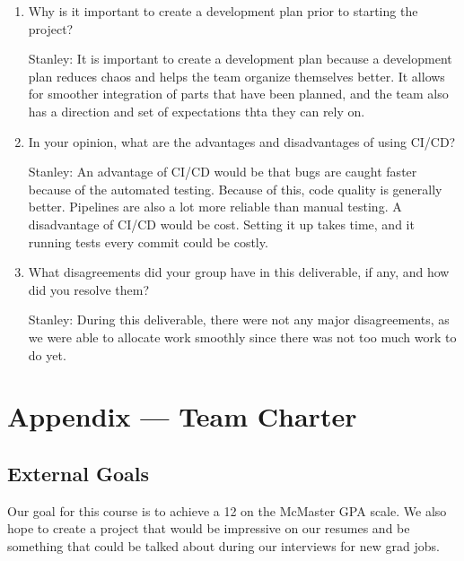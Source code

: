 \documentclass{article}
\begin{document}



\begin{enumerate}
    \item Why is it important to create a development plan prior to starting the
    project?

Stanley: It is important to create a development plan because a development plan reduces chaos and helps the team organize themselves better. It allows for smoother integration of parts that have been planned, and the team also has a direction and set of expectations thta they can rely on. 

    \item In your opinion, what are the advantages and disadvantages of using
    CI/CD?

Stanley: An advantage of CI/CD would be that bugs are caught faster because of the automated testing. Because of this, code quality is generally better. Pipelines are also a lot more reliable than manual testing. A disadvantage of CI/CD would be cost. Setting it up takes time, and it running tests every commit could be costly.

    \item What disagreements did your group have in this deliverable, if any,
    and how did you resolve them?

Stanley: During this deliverable, there were not any major disagreements, as we were able to allocate work smoothly since there was not too much work to do yet.

\end{enumerate}

\newpage{}

\section*{Appendix --- Team Charter}


\subsection*{External Goals}

Our goal for this course is to achieve a 12 on the McMaster GPA scale. We also hope to create a project that would be impressive on our resumes and be something that could be talked about during our interviews for new grad jobs. 
\end{document}

